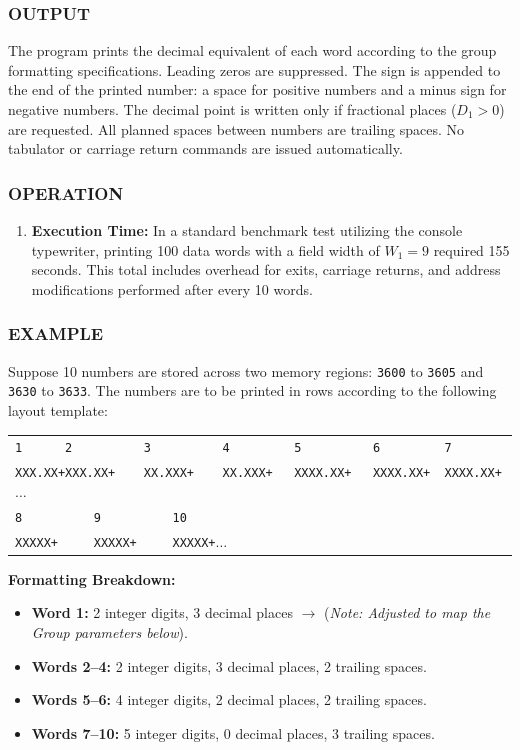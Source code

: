 \subsubsection*{OUTPUT}
The program prints the decimal equivalent of each word according to the group formatting specifications. Leading zeros are suppressed. The sign is appended to the end of the printed number: a space for positive numbers and a minus sign for negative numbers. The decimal point is written only if fractional places ($D_1 > 0$) are requested. All planned spaces between numbers are trailing spaces. No tabulator or carriage return commands are issued automatically.

\subsubsection*{OPERATION}
\begin{enumerate}
    \item \textbf{Execution Time:} In a standard benchmark test utilizing the console typewriter, printing 100 data words with a field width of $W_1 = 9$ required 155 seconds. This total includes overhead for exits, carriage returns, and address modifications performed after every 10 words.
\end{enumerate}

\subsubsection*{EXAMPLE}
Suppose 10 numbers are stored across two memory regions: \texttt{3600} to \texttt{3605} and \texttt{3630} to \texttt{3633}. The numbers are to be printed in rows according to the following layout template:

\begin{center}
\footnotesize
\begin{tabular}{l}
\texttt{1\ \ \ \ \ \ 2\ \ \ \ \ \ \ \ \ \ 3\ \ \ \ \ \ \ \ \ \ 4\ \ \ \ \ \ \ \ \ 5\ \ \ \ \ \ \ \ \ \ 6\ \ \ \ \ \ \ \ \ 7} \\
\texttt{XXX.XX+XXX.XX+ \ \ \ XX.XXX+\ \ \ \ XX.XXX+\ \ \ XXXX.XX+\ \ \ XXXX.XX+\ \ XXXX.XX+$\dots$} \\
\texttt{8\ \ \ \ \ \ \ \ \ \ 9\ \ \ \ \ \ \ \ \ \ 10} \\
\texttt{XXXXX+\ \ \ \ \ XXXXX+\ \ \ \ \ XXXXX+$\dots$} \\
\end{tabular}
\end{center}

\textbf{Formatting Breakdown:}
\begin{itemize}
    \item \textbf{Word 1:} 2 integer digits, 3 decimal places $\rightarrow$ (\textit{Note: Adjusted to map the Group parameters below}).
    \item \textbf{Words 2--4:} 2 integer digits, 3 decimal places, 2 trailing spaces.
    \item \textbf{Words 5--6:} 4 integer digits, 2 decimal places, 2 trailing spaces.
    \item \textbf{Words 7--10:} 5 integer digits, 0 decimal places, 3 trailing spaces.
\end{itemize}

